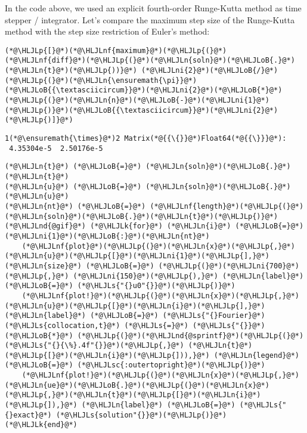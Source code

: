 \documentclass[12pt,landscape]{article}
\newcommand{\HLJLk}[1]{\textcolor[RGB]{148,91,176}{\textbf{#1}}}
\newcommand{\HLJLn}[1]{#1}
\newcommand{\HLJLnd}[1]{\textcolor[RGB]{214,102,97}{#1}}
\newcommand{\HLJLnf}[1]{\textcolor[RGB]{66,102,213}{#1}}
\newcommand{\HLJLs}[1]{\textcolor[RGB]{201,61,57}{#1}}
\newcommand{\HLJLsc}[1]{\textcolor[RGB]{201,61,57}{#1}}
\newcommand{\HLJLni}[1]{\textcolor[RGB]{59,151,46}{#1}}
\newcommand{\HLJLoB}[1]{\textcolor[RGB]{102,102,102}{\textbf{#1}}}
\newcommand{\HLJLp}[1]{#1}
\begin{document}
{In the code above, we used an explicit fourth-order Runge-Kutta method as time stepper / integrator.  Let's compare the maximum step size of the Runge-Kutta method with the step size restriction of Euler's method:


\begin{lstlisting}
(*@\HLJLp{[}@*)(*@\HLJLnf{maximum}@*)(*@\HLJLp{(}@*)(*@\HLJLnf{diff}@*)(*@\HLJLp{(}@*)(*@\HLJLn{soln}@*)(*@\HLJLoB{.}@*)(*@\HLJLn{t}@*)(*@\HLJLp{))}@*) (*@\HLJLni{2}@*)(*@\HLJLoB{/}@*)(*@\HLJLp{(}@*)(*@\HLJLn{\ensuremath{\pi}}@*)(*@\HLJLoB{{\textasciicircum}}@*)(*@\HLJLni{2}@*)(*@\HLJLoB{*}@*)(*@\HLJLp{(}@*)(*@\HLJLn{n}@*)(*@\HLJLoB{-}@*)(*@\HLJLni{1}@*)(*@\HLJLp{)}@*)(*@\HLJLoB{{\textasciicircum}}@*)(*@\HLJLni{2}@*)(*@\HLJLp{)]}@*)
\end{lstlisting}

\begin{lstlisting}
1(*@\ensuremath{\times}@*)2 Matrix(*@{{\{}}@*)Float64(*@{{\}}}@*):
 4.35304e-5  2.50176e-5
\end{lstlisting}


\begin{lstlisting}
(*@\HLJLn{t}@*) (*@\HLJLoB{=}@*) (*@\HLJLn{soln}@*)(*@\HLJLoB{.}@*)(*@\HLJLn{t}@*)
(*@\HLJLn{u}@*) (*@\HLJLoB{=}@*) (*@\HLJLn{soln}@*)(*@\HLJLoB{.}@*)(*@\HLJLn{u}@*)
(*@\HLJLn{nt}@*) (*@\HLJLoB{=}@*) (*@\HLJLnf{length}@*)(*@\HLJLp{(}@*)(*@\HLJLn{soln}@*)(*@\HLJLoB{.}@*)(*@\HLJLn{t}@*)(*@\HLJLp{)}@*)
(*@\HLJLnd{@gif}@*) (*@\HLJLk{for}@*) (*@\HLJLn{i}@*) (*@\HLJLoB{=}@*) (*@\HLJLni{1}@*)(*@\HLJLoB{:}@*)(*@\HLJLn{nt}@*) 
    (*@\HLJLnf{plot}@*)(*@\HLJLp{(}@*)(*@\HLJLn{x}@*)(*@\HLJLp{,}@*) (*@\HLJLn{u}@*)(*@\HLJLp{[}@*)(*@\HLJLni{1}@*)(*@\HLJLp{],}@*) (*@\HLJLn{size}@*) (*@\HLJLoB{=}@*) (*@\HLJLp{(}@*)(*@\HLJLni{700}@*)(*@\HLJLp{,}@*) (*@\HLJLni{150}@*)(*@\HLJLp{),}@*) (*@\HLJLn{label}@*) (*@\HLJLoB{=}@*) (*@\HLJLs{"{}u0"{}}@*)(*@\HLJLp{)}@*)
    (*@\HLJLnf{plot!}@*)(*@\HLJLp{(}@*)(*@\HLJLn{x}@*)(*@\HLJLp{,}@*) (*@\HLJLn{u}@*)(*@\HLJLp{[}@*)(*@\HLJLn{i}@*)(*@\HLJLp{],}@*) (*@\HLJLn{label}@*) (*@\HLJLoB{=}@*) (*@\HLJLs{"{}Fourier}@*) (*@\HLJLs{collocation,t}@*) (*@\HLJLs{=}@*) (*@\HLJLs{"{}}@*) (*@\HLJLoB{*}@*) (*@\HLJLp{(}@*)(*@\HLJLnd{@sprintf}@*)(*@\HLJLp{(}@*)(*@\HLJLs{"{}{\%}.4f"{}}@*)(*@\HLJLp{,}@*) (*@\HLJLn{t}@*)(*@\HLJLp{[}@*)(*@\HLJLn{i}@*)(*@\HLJLp{])),}@*) (*@\HLJLn{legend}@*) (*@\HLJLoB{=}@*) (*@\HLJLsc{:outertopright}@*)(*@\HLJLp{)}@*)
    (*@\HLJLnf{plot!}@*)(*@\HLJLp{(}@*)(*@\HLJLn{x}@*)(*@\HLJLp{,}@*) (*@\HLJLn{ue}@*)(*@\HLJLoB{.}@*)(*@\HLJLp{(}@*)(*@\HLJLn{x}@*)(*@\HLJLp{,}@*)(*@\HLJLn{t}@*)(*@\HLJLp{[}@*)(*@\HLJLn{i}@*)(*@\HLJLp{]),}@*) (*@\HLJLn{label}@*) (*@\HLJLoB{=}@*) (*@\HLJLs{"{}exact}@*) (*@\HLJLs{solution"{}}@*)(*@\HLJLp{)}@*)
(*@\HLJLk{end}@*)
\end{lstlisting}

}
\end{document}
